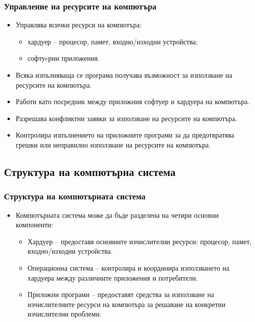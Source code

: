 \documentclass[ignorenonframetext, hyperref=unicode]{beamer}
\begin{document}
\begin{frame}\frametitle{Управление на ресурсите на компютъра}
\begin{itemize}
\item Управлява всички ресурси на компютъра:
\begin{itemize}
  \item хардуер -- процесор, памет, входно/изходни устройства; 
  \item софтуeрни приложения.
\end{itemize}
\item Всяка изпълняваща се програма получава възможност за използване на 
ресурсите на компютъра.
\item Работи като посредник между приложния софтуер и хардуера на компютъра.
\item Разрешава конфликтни заявки за използване на ресурсите на компютъра.
\item Контролира изпълнението на приложните програми за да предотвратява грешки
или неправилно използване на ресурсите на компютъра.
\end{itemize}
\end{frame}




\subsection{Структура на компютърна система}

\begin{frame}\frametitle{Структура на компютърната система}
\begin{itemize}
  \item Компютърната система може да бъде разделена на четири основни
  компоненти: 
\begin{itemize}
  \item Хардуер -- предоставя основните изчислителни ресурси: процесор, памет,
  входно/изходни устройства.
  \item Операционна система -- контролира и координира използването на хардуера между
  различните приложения и потребители.
  \item Приложни програми -- предоставят средства за използване на
  изчислителните ресурси на компютъра за решаване на конкретни изчислителни проблеми.
\end{itemize}
  
\end{itemize}

\end{frame}
\end{document}

